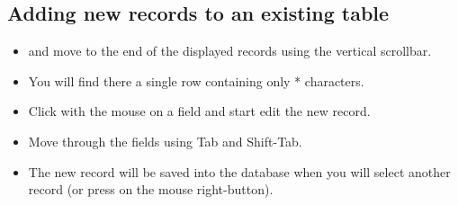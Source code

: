 \subsection{Adding new records to an existing table}
\begin{itemize}
    \item {} and move to the end of the displayed records using the vertical scrollbar.
    \item You will find there a single row containing only * characters. 
    \item Click with the mouse on a field and start edit the new record. 
    \item Move through the fields using Tab and Shift-Tab.
    \item The new record will be saved into the database when you will select another record (or press on the mouse right-button).  
\end{itemize}
